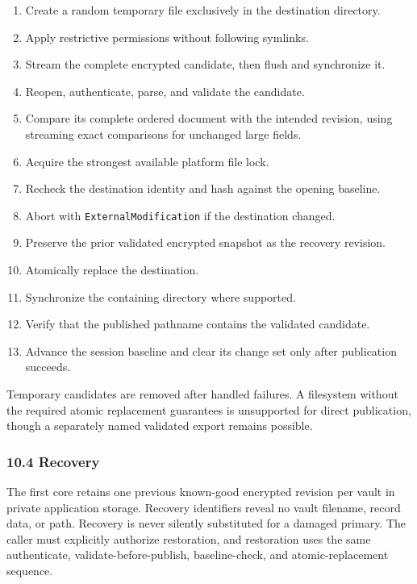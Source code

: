 \documentclass[
  letterpaper,
]{article}
\providecommand{\tightlist}{%
  \setlength{\itemsep}{0pt}\setlength{\parskip}{0pt}}
\begin{document}
\begin{enumerate}
\def\labelenumi{\arabic{enumi}.}
\tightlist
\item
  Create a random temporary file exclusively in the destination directory.
\item
  Apply restrictive permissions without following symlinks.
\item
  Stream the complete encrypted candidate, then flush and synchronize it.
\item
  Reopen, authenticate, parse, and validate the candidate.
\item
  Compare its complete ordered document with the intended revision, using streaming exact comparisons for unchanged
  large fields.
\item
  Acquire the strongest available platform file lock.
\item
  Recheck the destination identity and hash against the opening baseline.
\item
  Abort with \nolinkurl{ExternalModification} if the destination changed.
\item
  Preserve the prior validated encrypted snapshot as the recovery revision.
\item
  Atomically replace the destination.
\item
  Synchronize the containing directory where supported.
\item
  Verify that the published pathname contains the validated candidate.
\item
  Advance the session baseline and clear its change set only after publication succeeds.
\end{enumerate}

Temporary candidates are removed after handled failures. A filesystem without the required atomic replacement guarantees
is unsupported for direct publication, though a separately named validated export remains possible.

\subsubsection{10.4 Recovery}\label{104-recovery}

The first core retains one previous known-good encrypted revision per vault in private application storage. Recovery
identifiers reveal no vault filename, record data, or path. Recovery is never silently substituted for a damaged
primary. The caller must explicitly authorize restoration, and restoration uses the same authenticate,
validate-before-publish, baseline-check, and atomic-replacement sequence.
\end{document}
